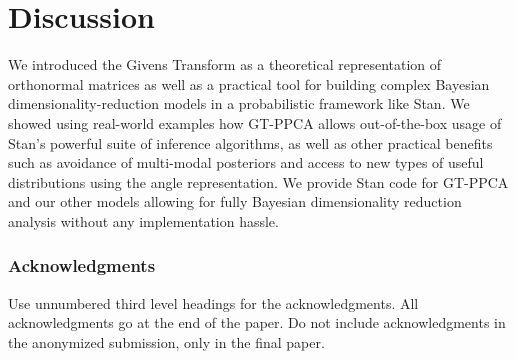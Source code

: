 \documentclass{article}
\begin{document}
\section{Discussion}
We introduced the Givens Transform as a theoretical representation of orthonormal matrices as well as a practical tool for building complex Bayesian dimensionality-reduction models in a probabilistic framework like Stan. We showed using real-world examples how GT-PPCA allows out-of-the-box usage of Stan's powerful suite of inference algorithms, as well as other practical benefits such as avoidance of multi-modal posteriors and access to new types of useful distributions using the angle representation. We provide Stan code for GT-PPCA and our other models allowing for fully Bayesian dimensionality reduction analysis without any implementation hassle.

\subsubsection*{Acknowledgments}

Use unnumbered third level headings for the acknowledgments. All
acknowledgments go at the end of the paper. Do not include
acknowledgments in the anonymized submission, only in the final paper.

\end{document}
